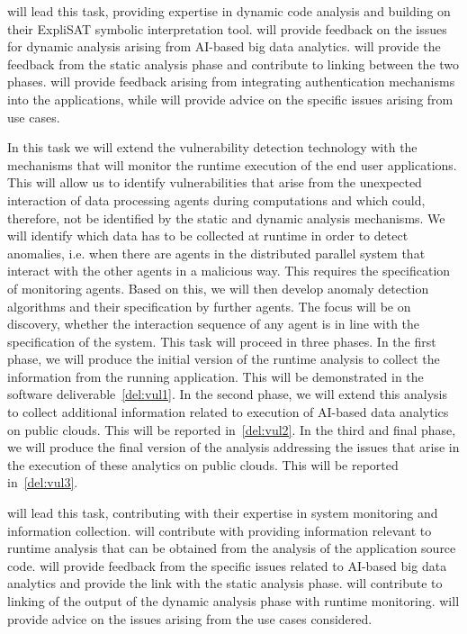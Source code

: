 \begin{Workpackage}{\thewpno}
\begin{Task}
\IBMshort{} will lead this task, providing expertise in dynamic code analysis and building on their ExpliSAT symbolic interpretation tool. \UODshort{} will provide feedback on the issues for dynamic analysis arising from AI-based big data analytics. \YAGshort{} will provide the feedback from the static analysis phase and contribute to linking between the two phases. \COGNIshort{} will provide feedback arising from integrating authentication mechanisms into the applications, while \SOPRAshort{} will provide advice on the specific issues arising from use cases.
\end{Task}

\begin{Task}
\TaskResults{%
\ref{del:vul1},
\ref{del:vul2},
\ref{del:vul3}
}
\TaskHeader{}
In this task we will extend the vulnerability detection technology with the mechanisms that will monitor the runtime execution of the end user applications. This will allow us to identify vulnerabilities that arise from the unexpected interaction of data processing agents during computations and which could, therefore, not be identified by the static and dynamic analysis mechanisms. We will identify which data has to be collected at runtime in order to detect anomalies, i.e. when there are agents in the distributed parallel system that interact with the other agents in a malicious way. This requires the specification of monitoring agents. Based on this, we will then develop anomaly detection algorithms and their specification by further agents. The focus will be on discovery, whether the interaction sequence of any agent is in line with the specification of the system. This task will proceed in three phases. In the first phase, we will produce the initial version of the runtime analysis to collect the information from the running application. This will be demonstrated in the software deliverable~\ref{del:vul1}. In the second phase, we will extend this analysis to collect additional information related to execution of AI-based data analytics on public clouds. This will be reported in~\ref{del:vul2}. In the third and final phase, we will produce the final version of the analysis addressing the issues that arise in the execution of these analytics on public clouds. This will be reported in~\ref{del:vul3}.

\SCCHshort{} will lead this task, contributing with their expertise in system monitoring and information collection. \YAGshort{} will contribute with providing information relevant to runtime analysis that can be obtained from the analysis of the application source code. \UODshort{} will provide feedback from the specific issues related to AI-based big data analytics and provide the link with the static analysis phase. \IBMshort{} will contribute to linking of the output of the dynamic analysis phase with runtime monitoring. \SOPRAshort{} will provide advice on the issues arising from the use cases considered. 
\end{Task}


\end{Workpackage}
